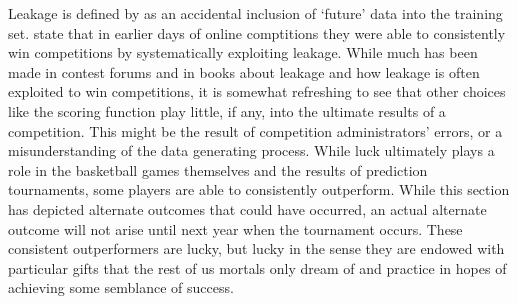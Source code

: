 

Leakage is defined by \cite{schutt2013doing} as an accidental inclusion of `future' data into the training set. \cite{schutt2013doing} state that in earlier days of online comptitions they were able to consistently win competitions by systematically exploiting leakage. While much has been made in contest forums and in books  about leakage and how leakage is often exploited to win competitions, it is somewhat refreshing to see that other choices like the scoring function play little, if any, into the ultimate results of a competition. This might be the result of competition administrators' errors, or a misunderstanding of the data generating process. While luck ultimately plays a role in the basketball games themselves and the results of prediction tournaments, some players are able to consistently outperform. While this section has depicted alternate outcomes that could have occurred, an actual alternate outcome will not arise until next year when the tournament occurs.  These consistent outperformers are lucky, but lucky in the sense they are endowed with particular gifts that the rest of us mortals only dream of and practice in hopes of achieving some semblance of success.  